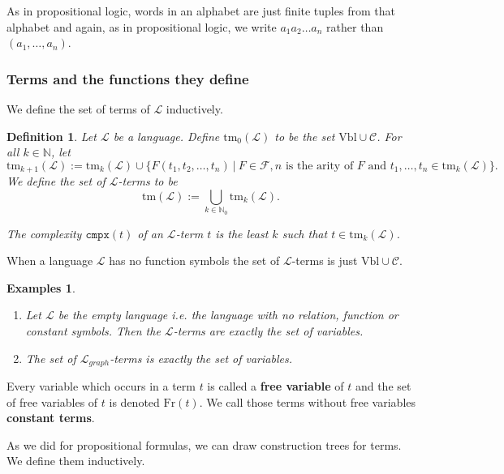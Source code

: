\documentclass[11pt]{article}
\newcommand{\tm}{\textrm{tm}}
\newcommand{\cmpx}{\texttt{cmpx}}
\newtheorem{examples}[theorem]{Examples}
\newtheorem{definition}[theorem]{Definition}
\newcommand{\mcal}[1]{\mathcal{#1}}
\newcommand{\N}{\mathbb{N}}
\newcommand{\st}{\ \vert \ }
\begin{document}
As in propositional logic, words in an alphabet are just finite tuples from that alphabet and again, as in propositional logic, we write $a_1a_2\ldots a_n$ rather than $(a_1,\ldots,a_n)$.



\subsubsection*{Terms and the functions they define}

We define the set of terms of $\mcal{L}$ inductively.

\begin{definition}
Let $\mcal{L}$ be a language.  Define $\tm_0(\mcal{L})$ to be the set $\textrm{Vbl}\cup \mcal{C}$. For all $k\in\N$, let
\[\tm_{k+1}(\mcal{L}):=\tm_k(\mcal{L})\cup\{F(t_1,t_2,\ldots,t_n) \st F\in\mcal{F}, n\text{ is the arity of }F \text{ and } t_1,\ldots,t_n\in\tm_{k}(\mcal{L}) \}.\]
We define the set of $\mcal{L}$-terms to be
\[\tm(\mcal{L}):=\bigcup_{k\in\N_0}\tm_k(\mcal{L}).\]

The complexity $\cmpx(t)$ of an $\mcal{L}$-term $t$ is the least $k$ such that $t\in\tm_k(\mcal{L})$.
\end{definition}

When a language $\mcal{L}$ has no function symbols the set of $\mcal{L}$-terms is just $\textrm{Vbl}\cup\mcal{C}$.
\begin{examples}
\begin{enumerate}
\item Let $\mcal{L}$ be the empty language i.e. the language with no relation, function or constant symbols. Then the $\mcal{L}$-terms are exactly the set of variables.
\item The set of $\mcal{L}_{graph}$-terms is exactly the set of variables.
\end{enumerate}
\end{examples}

Every variable which occurs in a term $t$ is called a \textbf{free variable} of $t$ and the set of free variables of $t$ is denoted $\textrm{Fr}(t)$. We call those terms without free variables \textbf{constant terms}.

As we did for propositional formulas, we can draw construction trees for terms. We define them inductively.
\end{document}
